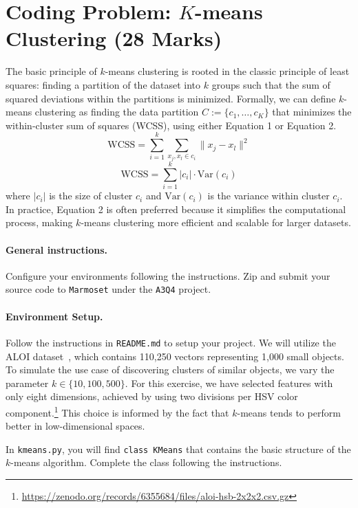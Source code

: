 \documentclass[12pt]{article}
\begin{document}
\section{Coding Problem: $K$-means Clustering (28 Marks)}
The basic principle of $k$-means clustering is rooted in the classic principle of least squares: finding a partition of the dataset into $k$ groups such that the sum of squared deviations within the partitions is minimized.
Formally, we can define $k$-means clustering as finding the data partition $ C := \{c_1, \ldots, c_K\} $ that minimizes the within-cluster sum of squares (WCSS), using either Equation 1 or Equation 2.
\begin{equation}
    \text{WCSS} = \sum_{i=1}^k \sum_{x_j, x_l \in c_i} \| x_j - x_l \|^2
\end{equation}
\begin{equation}
    \text{WCSS} = \sum_{i=1}^k |c_i| \cdot \text{Var}(c_i)
\end{equation}
where \( |c_i| \) is the size of cluster \( c_i \) and \( \text{Var}(c_i) \) is the variance within cluster \( c_i \).
In practice, Equation 2 is often preferred because it simplifies the computational process, making $k$-means clustering more efficient and scalable for larger datasets.

\paragraph{General instructions.}
Configure your environments following the instructions.
Zip and submit your source code to \texttt{Marmoset} under the \texttt{A3Q4} project.

\paragraph{Environment Setup.}
Follow the instructions in \texttt{README.md} to setup your project.
We will utilize the ALOI dataset~\cite{schubert_2022_6355684}, which contains 110,250 vectors representing 1,000 small objects.
To simulate the use case of discovering clusters of similar objects, we vary the parameter $ k \in \{ 10, 100, 500 \} $.
For this exercise, we have selected features with only eight dimensions, achieved by using two divisions per HSV color component.\footnote{\url{https://zenodo.org/records/6355684/files/aloi-hsb-2x2x2.csv.gz}}
This choice is informed by the fact that $k$-means tends to perform better in low-dimensional spaces.

In \texttt{kmeans.py}, you will find \texttt{class KMeans} that contains the basic structure of the $k$-means algorithm.
Complete the class following the instructions.
\end{document}

